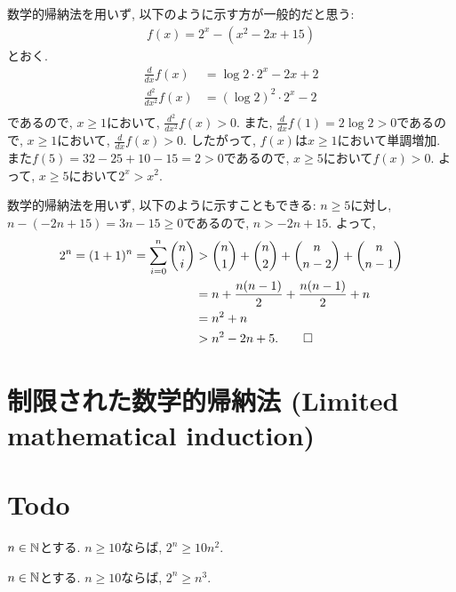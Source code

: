 \begin{rem}
  数学的帰納法を用いず, 以下のように示す方が一般的だと思う:
  \begin{align*}
    f(x)=2^x-(x^2-2x+15)
  \end{align*}
  とおく.
  \begin{align*}
    \frac{d}{dx}f(x)&=\log 2 \cdot 2^x-2x+2\\
    \frac{d^2}{dx^2}f(x)&=(\log 2)^2 \cdot 2^x-2\\
  \end{align*}
  であるので, $x\geq 1$において,
  $\frac{d^2}{dx^2}f(x)>0$.
  また, $\frac{d}{dx}f(1)=2\log 2>0$であるので,
  $x\geq 1$において,
  $\frac{d}{dx}f(x)> 0$.
  したがって, $f(x)$は$x\geq 1$において単調増加.
  また$f(5)=32-25+10-15=2>0$であるので,
  $x\geq 5$において$f(x) > 0$.
  よって, $x\geq 5$において$2^x > x^2$.
\end{rem}

\begin{rem}
  数学的帰納法を用いず, 以下のように示すこともできる:
  $n\geq 5$に対し, $n-(-2n+15)=3n-15\geq 0$であるので,
  $n>-2n+15$. よって,
  \begin{align*}
    2^n=(1+1)^n=\sum_{i=0}^n \binom{n}{i}
    &> \binom{n}{1}+\binom{n}{2}+\binom{n}{n-2}+\binom{n}{n-1}\\
    &=n+\frac{n(n-1)}{2}+\frac{n(n-1)}{2}+n\\
    &=n^2+n\\
    &>n^2-2n+5
    .\qedhere
  \end{align*}
\end{rem}


\section{制限された数学的帰納法 (Limited mathematical induction)}

\section{Todo}






\begin{prop}
$n\in\mathbb{N}$とする.
  $n\geq 10$ならば, $2^n\geq 10n^2$.
\end{prop}

\begin{prop}
$n\in\mathbb{N}$とする.
  $n\geq 10$ならば, $2^n\geq n^3$.
\end{prop}

